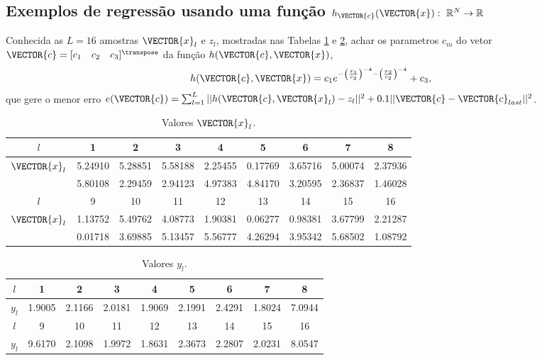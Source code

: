 \subsection{Exemplos de regressão usando uma função
$h_{\VECTOR{c}}(\VECTOR{x}):~\mathbb{R}^N \rightarrow \mathbb{R}$}

\begin{example}\label{ex:theo:maphcxrnr1}
Conhecida as $L=16$ amostras $\VECTOR{x}_l$ e $z_l$, mostradas nas  
Tabelas \ref{table:theo:maphcxrnr1:xn} e \ref{table:theo:maphcxrnr1:zn},
achar os parametros $c_m$ do vetor $\VECTOR{c}=[c_1\quad c_2\quad c_3]^{\transpose}$ da função $h(\VECTOR{c},\VECTOR{x})$, 
\begin{equation}
h(\VECTOR{c},\VECTOR{x})=c_1 e^{-\left(\frac{x_1}{c_2}\right)^{-4}-\left(\frac{x_2}{c_2}\right)^{-4}}+c_3,
\end{equation}
que gere o menor erro 
$e(\VECTOR{c})=\sum_{l=1}^{L} ||h(\VECTOR{c},\VECTOR{x}_l)-z_l||^2 + 0.1 ||\VECTOR{c}-\VECTOR{c}_{last}||^2$.
\end{example}


\begin{table}[h!]
\centering
\begin{tabular}{|c|c|c|c|c|c|c|c|c|} 
 \hline
$l$   & 1 & 2 & 3 & 4 & 5 & 6 & 7 & 8\\ \hline
$\VECTOR{x}_l$ & 5.24910 & 5.28851 & 5.58188 & 2.25455 & 0.17769 & 3.65716 & 5.00074 & 2.37936 \\ 
             ~ & 5.80108 & 2.29459 & 2.94123 & 4.97383 & 4.84170 & 3.20595 & 2.36837 & 1.46028 \\ \hline
 \hline
$l$   & 9 & 10 & 11 & 12 & 13 & 14 & 15 & 16\\  \hline
$\VECTOR{x}_l$ & 1.13752 & 5.49762 & 4.08773 & 1.90381 & 0.06277 & 0.98381 & 3.67799 & 2.21287 \\
             ~ & 0.01718 & 3.69885 & 5.13457 & 5.56777 & 4.26294 & 3.95342 & 5.68502 & 1.08792 \\ \hline
\end{tabular}
\caption{Valores $\VECTOR{x}_l$.}
\label{table:theo:maphcxrnr1:xn}
\end{table}

\begin{table}[h!]
\centering
\begin{tabular}{|c|c|c|c|c|c|c|c|c|} 
 \hline
$l$   & 1 & 2 & 3 & 4 & 5 & 6 & 7 & 8\\ \hline
$y_l$ & 1.9005 & 2.1166 & 2.0181 & 1.9069 & 2.1991 & 2.4291 & 1.8024 & 7.0944  \\ \hline
 \hline
$l$   & 9 & 10 & 11 & 12 & 13 & 14 & 15 & 16\\  \hline
$y_l$ & 9.6170 & 2.1098 & 1.9972 & 1.8631 & 2.3673 & 2.2807 & 2.0231 & 8.0547 \\ \hline
\end{tabular}
\caption{Valores $y_l$.}
\label{table:theo:maphcxrnr1:zn}
\end{table}

